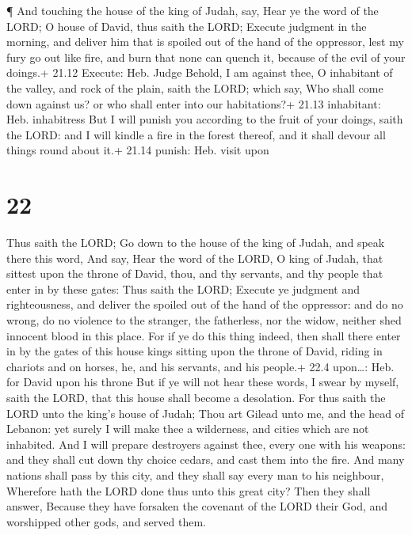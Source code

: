  ¶ And touching the house of the king of Judah, say, Hear
ye the word of the LORD;  O house of David, thus saith the
LORD; Execute judgment in the morning, and deliver him that is spoiled
out of the hand of the oppressor, lest my fury go out like fire, and
burn that none can quench it, because of the evil of your doings.+ 21.12
Execute: Heb. Judge  Behold, I am against thee, O
inhabitant of the valley, and rock of the plain, saith the LORD; which
say, Who shall come down against us? or who shall enter into our
habitations?+ 21.13 inhabitant: Heb. inhabitress  But I
will punish you according to the fruit of your doings, saith the LORD:
and I will kindle a fire in the forest thereof, and it shall devour all
things round about it.+ 21.14 punish: Heb. visit upon

\hypertarget{section-21}{%
\section{22}\label{section-21}}

 Thus saith the LORD; Go down to the house of the king of
Judah, and speak there this word,  And say, Hear the word of
the LORD, O king of Judah, that sittest upon the throne of David, thou,
and thy servants, and thy people that enter in by these gates:
 Thus saith the LORD; Execute ye judgment and righteousness,
and deliver the spoiled out of the hand of the oppressor: and do no
wrong, do no violence to the stranger, the fatherless, nor the widow,
neither shed innocent blood in this place.  For if ye do
this thing indeed, then shall there enter in by the gates of this house
kings sitting upon the throne of David, riding in chariots and on
horses, he, and his servants, and his people.+ 22.4 upon\ldots: Heb. for
David upon his throne  But if ye will not hear these words,
I swear by myself, saith the LORD, that this house shall become a
desolation.  For thus saith the LORD unto the king's house
of Judah; Thou art Gilead unto me, and the head of Lebanon: yet surely I
will make thee a wilderness, and cities which are not inhabited.
 And I will prepare destroyers against thee, every one with
his weapons: and they shall cut down thy choice cedars, and cast them
into the fire.  And many nations shall pass by this city,
and they shall say every man to his neighbour, Wherefore hath the LORD
done thus unto this great city?  Then they shall answer,
Because they have forsaken the covenant of the LORD their God, and
worshipped other gods, and served them.

